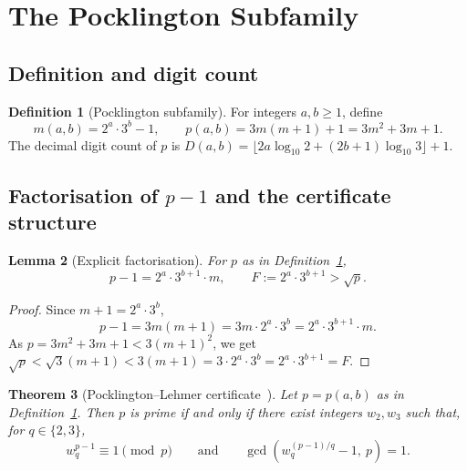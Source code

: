 \documentclass[11pt,a4paper]{article}
\theoremstyle{plain}
\newtheorem{theorem}{Theorem}[section]
\newtheorem{lemma}[theorem]{Lemma}
\theoremstyle{definition}
\newtheorem{definition}[theorem]{Definition}
\begin{document}
\section{The Pocklington Subfamily}
\label{sec:subfamily}

\subsection{Definition and digit count}

\begin{definition}[Pocklington subfamily]\label{def:subfamily}
For integers $a, b \ge 1$, define
\[
m(a, b) = 2^a \cdot 3^b - 1, \qquad p(a, b) = 3m(m+1) + 1 = 3m^2 + 3m + 1.
\]
The decimal digit count of $p$ is
$D(a, b) = \lfloor 2a \log_{10} 2 + (2b + 1) \log_{10} 3 \rfloor + 1$.
\end{definition}

\subsection{Factorisation of $p-1$ and the certificate structure}

\begin{rigorousbox}
\begin{lemma}[Explicit factorisation]\label{lem:factorisation}
For $p$ as in Definition~\ref{def:subfamily},
\[
p - 1 = 2^a \cdot 3^{b+1} \cdot m, \qquad F := 2^a \cdot 3^{b+1} > \sqrt{p}.
\]
\end{lemma}
\end{rigorousbox}

\begin{proof}
Since $m + 1 = 2^a \cdot 3^b$,
\[
p - 1 = 3m(m+1) = 3m \cdot 2^a \cdot 3^b = 2^a \cdot 3^{b+1} \cdot m.
\]
As $p = 3m^2 + 3m + 1 < 3(m+1)^2$, we get
$\sqrt{p} < \sqrt{3}(m+1) < 3(m+1) = 3 \cdot 2^a \cdot 3^b = 2^a \cdot 3^{b+1} = F$.
\end{proof}

\begin{rigorousbox}
\begin{theorem}[Pocklington--Lehmer certificate~\cite{pock,brillhart}]\label{thm:pock}
Let $p = p(a, b)$ as in Definition~\ref{def:subfamily}. Then $p$ is prime
\emph{if and only if} there exist integers $w_2, w_3$ such that, for $q \in \{2, 3\}$,
\[
w_q^{p-1} \equiv 1 \pmod{p} \qquad \text{and} \qquad
\gcd\!\left(w_q^{(p-1)/q} - 1, \ p\right) = 1.
\]
\end{theorem}
\end{rigorousbox}
\end{document}
